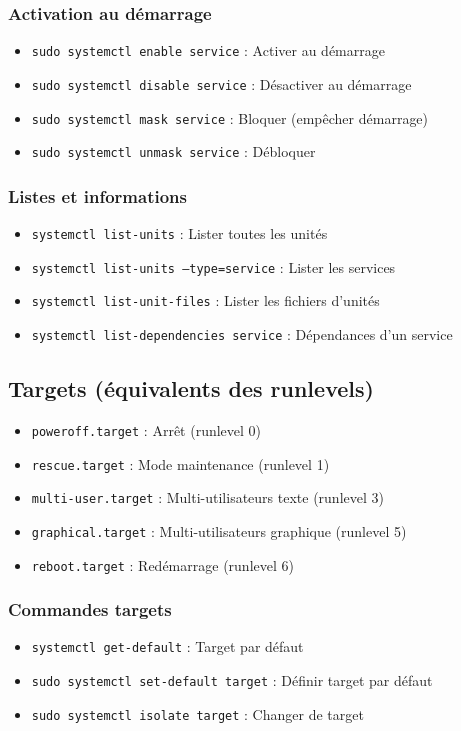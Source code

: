 \documentclass[12pt,a4paper]{article}
\begin{document}
\subsubsection{Activation au démarrage}
\begin{itemize}
    \item \texttt{sudo systemctl enable service} : Activer au démarrage
    \item \texttt{sudo systemctl disable service} : Désactiver au démarrage
    \item \texttt{sudo systemctl mask service} : Bloquer (empêcher démarrage)
    \item \texttt{sudo systemctl unmask service} : Débloquer
\end{itemize}

\subsubsection{Listes et informations}
\begin{itemize}
    \item \texttt{systemctl list-units} : Lister toutes les unités
    \item \texttt{systemctl list-units --type=service} : Lister les services
    \item \texttt{systemctl list-unit-files} : Lister les fichiers d'unités
    \item \texttt{systemctl list-dependencies service} : Dépendances d'un service
\end{itemize}

\subsection{Targets (équivalents des runlevels)}

\begin{itemize}
    \item \texttt{poweroff.target} : Arrêt (runlevel 0)
    \item \texttt{rescue.target} : Mode maintenance (runlevel 1)
    \item \texttt{multi-user.target} : Multi-utilisateurs texte (runlevel 3)
    \item \texttt{graphical.target} : Multi-utilisateurs graphique (runlevel 5)
    \item \texttt{reboot.target} : Redémarrage (runlevel 6)
\end{itemize}

\subsubsection{Commandes targets}
\begin{itemize}
    \item \texttt{systemctl get-default} : Target par défaut
    \item \texttt{sudo systemctl set-default target} : Définir target par défaut
    \item \texttt{sudo systemctl isolate target} : Changer de target
\end{itemize}
\end{document}
